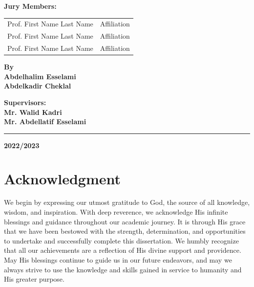 \documentclass[12pt]{report}
\begin{document}
\begin{titlepage}
    \textbf{Jury Members:}\\[0.2cm]
	\begin{tabular}{ll}
		Prof. First Name Last Name & Affiliation \\
		Prof. First Name Last Name & Affiliation \\
		Prof. First Name Last Name & Affiliation \\
	\end{tabular}
    \begin{minipage}{0.5\textwidth}
        \vspace{3cm}
        \begin{flushleft}
        \textbf{\Large By}\\
        \textbf{\Large Abdelhalim Esselami}\\
        \textbf{\Large Abdelkadir Cheklal}
        \end{flushleft}
        \end{minipage}%
        \begin{minipage}{0.5\textwidth}
        \vspace{3cm}
        \begin{flushright}
        \textbf{\Large Supervisors:}\\
        \textbf{\Large Mr. Walid Kadri}\\
        \textbf{\Large Mr. Abdellatif Esselami}
        \end{flushright}
        \end{minipage}
    
    \vspace{1cm}
    
    \rule{\linewidth}{1pt} %
    
    \vfill
    
    \textbf{\Large 2022/2023}
    
    \end{titlepage}

        \vspace*{\fill}
        \section*{\centering Acknowledgment}
        \bigskip
        We begin by expressing our utmost gratitude to God, the source of all knowledge, wisdom, and inspiration. With deep reverence, we acknowledge His infinite blessings and guidance throughout our academic journey. It is through His grace that we have been bestowed with the strength, determination, and opportunities to undertake and successfully complete this dissertation. We humbly recognize that all our achievements are a reflection of His divine support and providence. May His blessings continue to guide us in our future endeavors, and may we always strive to use the knowledge and skills gained in service to humanity and His greater purpose.
        
\end{document}
